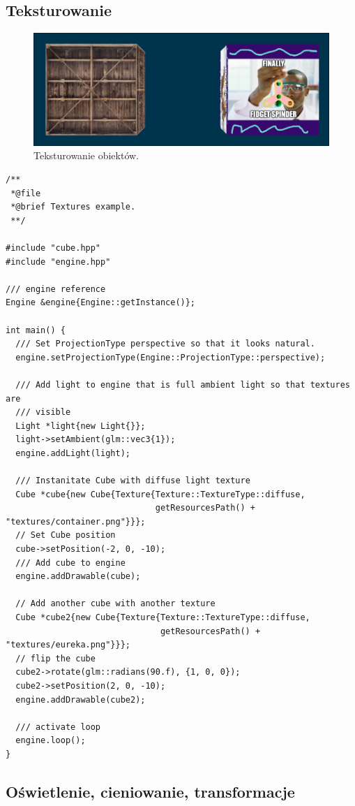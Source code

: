 \documentclass[11pt]{article}
\begin{document}
\subsection{Teksturowanie}
\label{sec:org9cb56de}

\begin{figure}[htbp]
\centering
\includegraphics[width=.9\linewidth]{img/test15.png}
\caption{Teksturowanie obiektów.}
\end{figure}

\begin{verbatim}
/**
 *@file
 *@brief Textures example.
 **/

#include "cube.hpp"
#include "engine.hpp"

/// engine reference
Engine &engine{Engine::getInstance()};

int main() {
  /// Set ProjectionType perspective so that it looks natural.
  engine.setProjectionType(Engine::ProjectionType::perspective);

  /// Add light to engine that is full ambient light so that textures are
  /// visible
  Light *light{new Light{}};
  light->setAmbient(glm::vec3{1});
  engine.addLight(light);

  /// Instanitate Cube with diffuse light texture
  Cube *cube{new Cube{Texture{Texture::TextureType::diffuse,
                              getResourcesPath() + "textures/container.png"}}};
  // Set Cube position
  cube->setPosition(-2, 0, -10);
  /// Add cube to engine
  engine.addDrawable(cube);

  // Add another cube with another texture
  Cube *cube2{new Cube{Texture{Texture::TextureType::diffuse,
                               getResourcesPath() + "textures/eureka.png"}}};
  // flip the cube
  cube2->rotate(glm::radians(90.f), {1, 0, 0});
  cube2->setPosition(2, 0, -10);
  engine.addDrawable(cube2);

  /// activate loop
  engine.loop();
}
\end{verbatim}
\subsection{Oświetlenie, cieniowanie, transformacje}
\label{sec:org2fd61dc}
\end{document}
